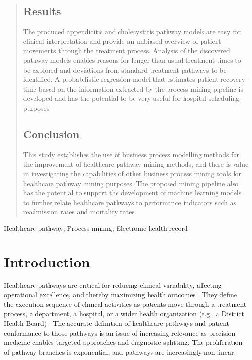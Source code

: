 \documentclass{elsarticle}
\begin{document}
\begin{frontmatter}
\begin{abstract}
\subsection*{Results}
The produced appendicitis and cholecystitis pathway models are easy for clinical interpretation and provide an unbiased overview of patient movements through the treatment process. Analysis of the discovered pathway models enables reasons for longer than usual treatment times to be explored and deviations from standard treatment pathways to be identified. A probabilistic regression model that estimates patient recovery time based on the information extracted by the process mining pipeline is developed and has the potential to be very useful for hospital scheduling purposes.

\subsection*{Conclusion}
This study establishes the use of business process modelling methods for the improvement of healthcare pathway mining methods, and there is value in investigating the capabilities of other business process mining tools for healthcare pathway mining purposes. The proposed mining pipeline also has the potential to support the development of machine learning models to further relate healthcare pathways to performance indicators such as readmission rates and mortality rates. 

\end{abstract}

\begin{keyword}
Healthcare pathway; Process mining; Electronic health record
\end{keyword}

\end{frontmatter}

\linenumbers

\section{Introduction}
Healthcare pathways are critical for reducing clinical variability, affecting operational excellence, and thereby maximizing health outcomes \cite{Lin2001}. They define the execution sequence of clinical activities as patients move through a treatment process, a department, a hospital, or a wider health organization (e.g., a District Health Board) \cite{Huang2016}. The accurate definition of healthcare pathways and patient conformance to those pathways is an issue of increasing relevance as precision medicine enables targeted approaches and diagnostic splitting. The proliferation of pathway branches is exponential, and pathways are increasingly non-linear. 
\end{document}
